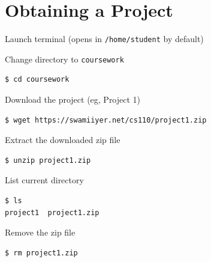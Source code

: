 \documentclass[8pt,a4paper,compress]{beamer}
\begin{document}
\section{Obtaining a Project}
\begin{frame}[fragile]
\pause\transdissolve

Launch terminal (opens in \lstinline{/home/student} by default)

\pause\transdissolve\bigskip

Change directory to \lstinline{coursework}

\begin{tcolorbox}[enhanced,drop shadow southwest,sharp corners,size=fbox,colback=black]
\begin{lstlisting}[style=terminal]
$ cd coursework
\end{lstlisting}
\end{tcolorbox}

\pause\transdissolve\bigskip

Download the project (eg, Project 1)

\begin{tcolorbox}[enhanced,drop shadow southwest,sharp corners,size=fbox,colback=black]
\begin{lstlisting}[style=terminal]
$ wget https://swamiiyer.net/cs110/project1.zip
\end{lstlisting}
\end{tcolorbox}

\pause\transdissolve\bigskip

Extract the downloaded zip file

\begin{tcolorbox}[enhanced,drop shadow southwest,sharp corners,size=fbox,colback=black]
\begin{lstlisting}[style=terminal]
$ unzip project1.zip
\end{lstlisting}
\end{tcolorbox}

\pause\transdissolve\bigskip

List current directory

\begin{tcolorbox}[enhanced,drop shadow southwest,sharp corners,size=fbox,colback=black]
\begin{lstlisting}[style=terminal]
$ ls
project1  project1.zip
\end{lstlisting}
\end{tcolorbox}

\pause\transdissolve\bigskip

Remove the zip file

\begin{tcolorbox}[enhanced,drop shadow southwest,sharp corners,size=fbox,colback=black]
\begin{lstlisting}[style=terminal]
$ rm project1.zip
\end{lstlisting}
\end{tcolorbox}
\end{frame}
\end{document}
